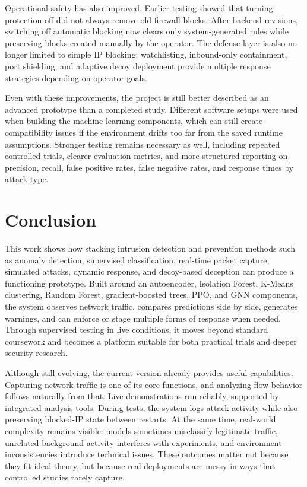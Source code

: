 \documentclass[conference]{IEEEtran}
\begin{document}
Operational safety has also improved. Earlier testing showed that turning protection off did not always remove old firewall blocks. After backend revisions, switching off automatic blocking now clears only system-generated rules while preserving blocks created manually by the operator. The defense layer is also no longer limited to simple IP blocking: watchlisting, inbound-only containment, port shielding, and adaptive decoy deployment provide multiple response strategies depending on operator goals.

Even with these improvements, the project is still better described as an advanced prototype than a completed study. Different software setups were used when building the machine learning components, which can still create compatibility issues if the environment drifts too far from the saved runtime assumptions. Stronger testing remains necessary as well, including repeated controlled trials, clearer evaluation metrics, and more structured reporting on precision, recall, false positive rates, false negative rates, and response times by attack type.

\section{Conclusion}

This work shows how stacking intrusion detection and prevention methods such as anomaly detection, supervised classification, real-time packet capture, simulated attacks, dynamic response, and decoy-based deception can produce a functioning prototype. Built around an autoencoder, Isolation Forest, K-Means clustering, Random Forest, gradient-boosted trees, PPO, and GNN components, the system observes network traffic, compares predictions side by side, generates warnings, and can enforce or stage multiple forms of response when needed. Through supervised testing in live conditions, it moves beyond standard coursework and becomes a platform suitable for both practical trials and deeper security research.

Although still evolving, the current version already provides useful capabilities. Capturing network traffic is one of its core functions, and analyzing flow behavior follows naturally from that. Live demonstrations run reliably, supported by integrated analysis tools. During tests, the system logs attack activity while also preserving blocked-IP state between restarts. At the same time, real-world complexity remains visible: models sometimes misclassify legitimate traffic, unrelated background activity interferes with experiments, and environment inconsistencies introduce technical issues. These outcomes matter not because they fit ideal theory, but because real deployments are messy in ways that controlled studies rarely capture.
\end{document}
